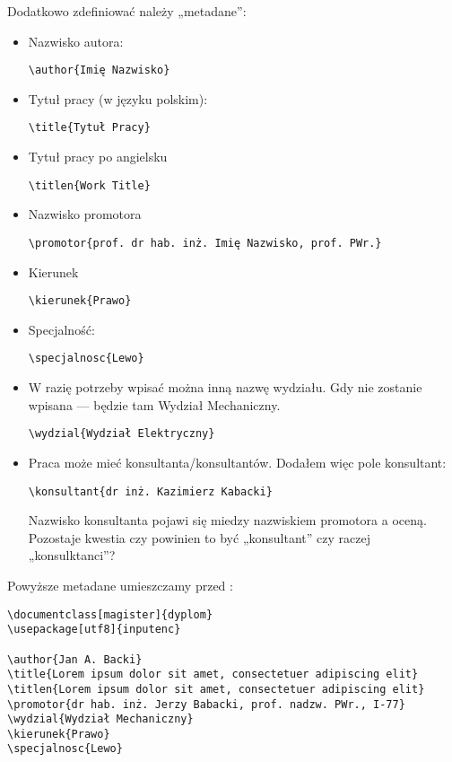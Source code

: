 \begin{enumerate}
Dodatkowo zdefiniować należy „metadane”:
\begin{itemize}
\item
Nazwisko autora:
\begin{verbatim}
\author{Imię Nazwisko}
\end{verbatim}
\item
Tytuł pracy (w języku polskim):
\begin{verbatim}
\title{Tytuł Pracy}
\end{verbatim}
\item
Tytuł pracy po angielsku
\begin{verbatim}
\titlen{Work Title}
\end{verbatim}
\item
Nazwisko promotora
\begin{verbatim}
\promotor{prof. dr hab. inż. Imię Nazwisko, prof. PWr.}
\end{verbatim}
\item
Kierunek
\begin{verbatim}
\kierunek{Prawo}
\end{verbatim}
\item
Specjalność:
\begin{verbatim}
\specjalnosc{Lewo}
\end{verbatim}
\item
W razię potrzeby wpisać można inną nazwę wydziału. Gdy nie zostanie wpisana — będzie tam Wydział Mechaniczny.
\begin{verbatim}
\wydzial{Wydział Elektryczny}
\end{verbatim}
\item
Praca może mieć konsultanta/konsultantów. Dodałem więc pole konsultant:
\begin{verbatim}
\konsultant{dr inż. Kazimierz Kabacki}
\end{verbatim}
Nazwisko konsultanta pojawi się miedzy nazwiskiem promotora a oceną. Pozostaje kwestia czy powinien to być „konsultant” czy raczej „konsulktanci”?
\end{itemize}
Powyższe metadane umieszczamy przed \verb||:
\begin{verbatim}
\documentclass[magister]{dyplom}
\usepackage[utf8]{inputenc}

\author{Jan A. Backi}
\title{Lorem ipsum dolor sit amet, consectetuer adipiscing elit}
\titlen{Lorem ipsum dolor sit amet, consectetuer adipiscing elit}
\promotor{dr hab. inż. Jerzy Babacki, prof. nadzw. PWr., I-77}
\wydzial{Wydział Mechaniczny}
\kierunek{Prawo}
\specjalnosc{Lewo}



\end{verbatim}
\end{enumerate}
